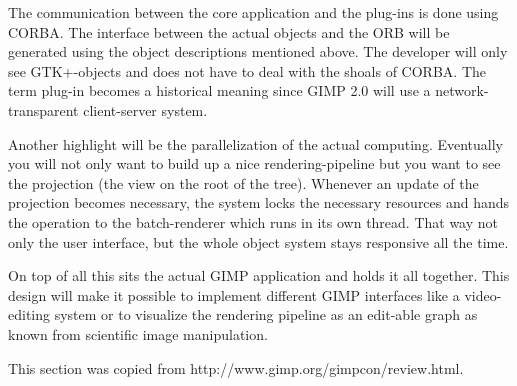 The communication between the core application and the plug-ins is done using CORBA. The interface between the actual objects and the ORB will be generated using the object descriptions mentioned above. The developer will only see GTK+-objects and does not have to deal with the shoals of CORBA. The term plug-in becomes a historical meaning since GIMP 2.0 will use a network-transparent client-server system. 


Another highlight will be the parallelization of the actual computing.  Eventually you will not only want to build up a nice rendering-pipeline but you want to see the projection (the view on the root of the tree). Whenever an update of the projection becomes necessary, the system locks the necessary resources and hands the operation to the batch-renderer which runs in its own thread. That way not only the user interface, but the whole object system stays responsive all the time. 


On top of all this sits the actual GIMP application and holds it all together.  This design will make it possible to implement different GIMP interfaces like a video-editing system or to visualize the rendering pipeline as an edit-able graph as known from scientific image manipulation.

This section was copied from http://www.gimp.org/gimpcon/review.html.
 
